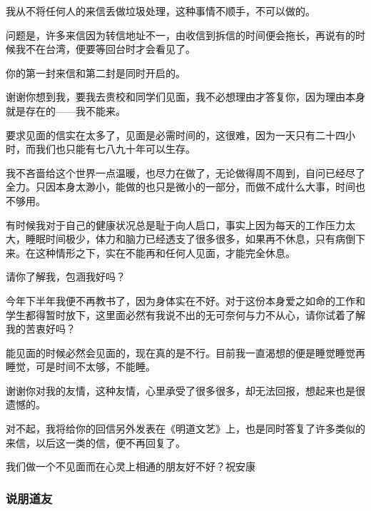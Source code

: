 \par {}
\par 我从不将任何人的来信丢做垃圾处理，这种事情不顺手，不可以做的。
\par 问题是，许多来信因为转信地址不一，由收信到拆信的时间便会拖长，再说有的时候我不在台湾，便要等回台时才会看见了。
\par 你的第一封来信和第二封是同时开启的。
\par 谢谢你想到我，要我去贵校和同学们见面，我不必想理由才答复你，因为理由本身就是存在的——我不能来。
\par 要求见面的信实在太多了，见面是必需时间的，这很难，因为一天只有二十四小时，而我们也只能有七八九十年可以生存。
\par 我不吝啬给这个世界一点温暖，也尽力在做了，无论做得周不周到，自问已经尽了全力。只因本身太渺小，能做的也只是微小的一部分，而做不成什么大事，时间也不够用。
\par 有时候我对于自己的健康状况总是耻于向人启口，事实上因为每天的工作压力太大，睡眠时间极少，体力和脑力已经透支了很多很多，如果再不休息，只有病倒下来。在这种情形之下，实在不能再和任何人见面，才能完全休息。
\par 请你了解我，包涵我好吗？
\par 今年下半年我便不再教书了，因为身体实在不好。对于这份本身爱之如命的工作和学生都得暂时放下，这里面必然有我说不出的无可奈何与力不从心，请你试着了解我的苦衷好吗？
\par 能见面的时候必然会见面的，现在真的是不行。目前我一直渴想的便是睡觉睡觉再睡觉，可是时间不太够，不能睡。
\par 谢谢你对我的友情，这种友情，心里承受了很多很多，却无法回报，想起来也是很遗憾的。
\par 对不起，我将给你的回信另外发表在《明道文艺》上，也是同时答复了许多类似的来信，以后这一类的信，便不再回复了。
\par 我们做一个不见面而在心灵上相通的朋友好不好？祝安康
\par {}
\par {}


\subsubsection{说朋道友}

